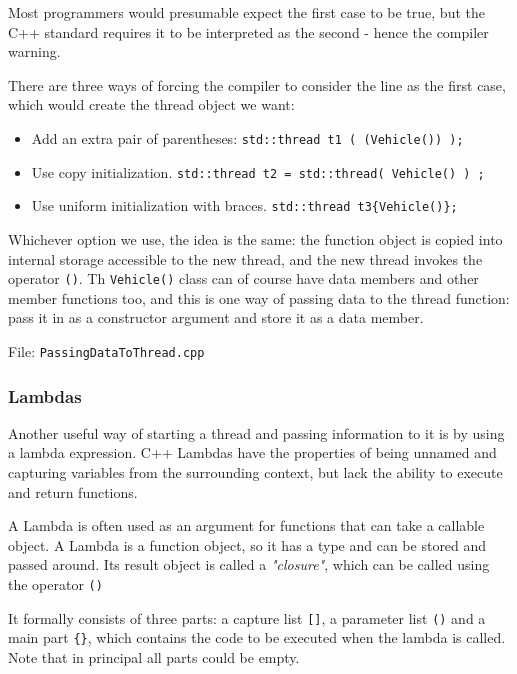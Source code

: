 \documentclass[11pt, a4paper]{article}
\begin{document}
Most programmers would presumable expect the first case to be true, but the C++ standard requires it to be interpreted as the second - hence the compiler warning. 


There are three ways of forcing the compiler to consider the line as the first case, which would create the thread object we want:


\begin{itemize}
  \item Add an extra pair of parentheses: \texttt{std::thread t1 ( (Vehicle()) );} 
	\item Use copy initialization. \texttt{std::thread t2 = std::thread( Vehicle() ) ;} 
	\item Use uniform initialization with braces. \texttt{std::thread t3\{Vehicle()\};} 
\end{itemize}

Whichever option we use, the idea is the same: the function object is copied into internal storage accessible to the new thread, and the new thread invokes the operator \texttt{()}. Th \texttt{Vehicle()} class can of course have data members and other member functions too, and this is one way of passing data to the thread function: pass it in as a constructor argument and store it as a data member.

File: \texttt{PassingDataToThread.cpp} 




\subsubsection{Lambdas}%
\label{sub:lambdas}


Another useful way of starting a thread and passing information to it is by using a lambda expression. C++ Lambdas have the properties of being unnamed and capturing variables from the surrounding context, but lack the ability to execute and return functions. 

A Lambda is often used as an argument for functions that can take a callable object. A Lambda is a function object, so it has a type and can be stored and passed around. Its result object is called a \textit{"closure"}, which can be called using the operator \texttt{()} 

It formally consists of three parts: a capture list \texttt{[]}, a parameter list \texttt{()} and a main part \texttt{\{\}}, which contains the code to be executed when the lambda is called. Note that in principal all parts could be empty.
\end{document}
